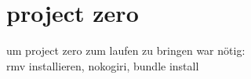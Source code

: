 \section{project zero}
um project zero zum laufen zu bringen war nötig:\\
rmv installieren, nokogiri, bundle install